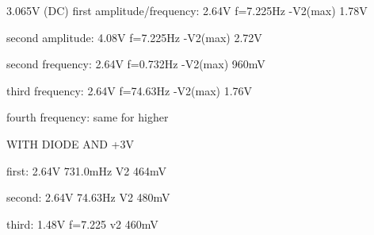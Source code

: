 3.065V (DC)
first amplitude/frequency: 2.64V  f=7.225Hz 
-V2(max) 1.78V

second amplitude: 4.08V f=7.225Hz
-V2(max) 2.72V

second frequency: 2.64V f=0.732Hz
-V2(max) 960mV

third frequency: 2.64V f=74.63Hz
-V2(max) 1.76V

fourth frequency: same for higher

WITH DIODE AND +3V

first: 2.64V 731.0mHz
V2 464mV

second: 2.64V  74.63Hz
V2 480mV

third: 1.48V f=7.225
v2 460mV

